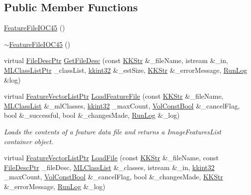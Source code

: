 \subsection*{Public Member Functions}
\begin{DoxyCompactItemize}
\item 
\hyperlink{class_k_k_m_l_l_1_1_feature_file_i_o_c45_ad1763dd3f92404588d80d21b8fff83c8}{Feature\+File\+I\+O\+C45} ()
\item 
\hyperlink{class_k_k_m_l_l_1_1_feature_file_i_o_c45_a890a0a2b3f62a0d0de6d4b85a2873f6f}{$\sim$\+Feature\+File\+I\+O\+C45} ()
\item 
virtual \hyperlink{namespace_k_k_m_l_l_aa0d0b6ab4ec18868a399b8455b05d914}{File\+Desc\+Ptr} \hyperlink{class_k_k_m_l_l_1_1_feature_file_i_o_c45_a17aa8ed6fcf2e293af5e018fc12a75d0}{Get\+File\+Desc} (const \hyperlink{class_k_k_b_1_1_k_k_str}{K\+K\+Str} \&\+\_\+file\+Name, istream \&\+\_\+in, \hyperlink{namespace_k_k_m_l_l_af091cde3f4a4315658b41a5e7583fc26}{M\+L\+Class\+List\+Ptr} \+\_\+class\+List, \hyperlink{namespace_k_k_b_a8fa4952cc84fda1de4bec1fbdd8d5b1b}{kkint32} \&\+\_\+est\+Size, \hyperlink{class_k_k_b_1_1_k_k_str}{K\+K\+Str} \&\+\_\+error\+Message, \hyperlink{class_k_k_b_1_1_run_log}{Run\+Log} \&log)
\item 
virtual \hyperlink{namespace_k_k_m_l_l_acf2ba92a3cf03e2b19674b24ff488ef6}{Feature\+Vector\+List\+Ptr} \hyperlink{class_k_k_m_l_l_1_1_feature_file_i_o_c45_a5223da28157b11024119c1edd93143c2}{Load\+Feature\+File} (const \hyperlink{class_k_k_b_1_1_k_k_str}{K\+K\+Str} \&\+\_\+file\+Name, \hyperlink{class_k_k_m_l_l_1_1_m_l_class_list}{M\+L\+Class\+List} \&\+\_\+ml\+Classes, \hyperlink{namespace_k_k_b_a8fa4952cc84fda1de4bec1fbdd8d5b1b}{kkint32} \+\_\+max\+Count, \hyperlink{namespace_k_k_b_a7d390f568e2831fb76b86b56c87bf92f}{Vol\+Const\+Bool} \&\+\_\+cancel\+Flag, bool \&\+\_\+successful, bool \&\+\_\+changes\+Made, \hyperlink{class_k_k_b_1_1_run_log}{Run\+Log} \&\+\_\+log)
\begin{DoxyCompactList}\small\item\em Loads the contents of a feature data file and returns a Image\+Features\+List container object. \end{DoxyCompactList}\item 
virtual \hyperlink{namespace_k_k_m_l_l_acf2ba92a3cf03e2b19674b24ff488ef6}{Feature\+Vector\+List\+Ptr} \hyperlink{class_k_k_m_l_l_1_1_feature_file_i_o_c45_a50c64295fe00ad20996b39665e5f1305}{Load\+File} (const \hyperlink{class_k_k_b_1_1_k_k_str}{K\+K\+Str} \&\+\_\+file\+Name, const \hyperlink{namespace_k_k_m_l_l_aa0d0b6ab4ec18868a399b8455b05d914}{File\+Desc\+Ptr} \+\_\+file\+Desc, \hyperlink{class_k_k_m_l_l_1_1_m_l_class_list}{M\+L\+Class\+List} \&\+\_\+classes, istream \&\+\_\+in, \hyperlink{namespace_k_k_b_a8fa4952cc84fda1de4bec1fbdd8d5b1b}{kkint32} \+\_\+max\+Count, \hyperlink{namespace_k_k_b_a7d390f568e2831fb76b86b56c87bf92f}{Vol\+Const\+Bool} \&\+\_\+cancel\+Flag, bool \&\+\_\+changes\+Made, \hyperlink{class_k_k_b_1_1_k_k_str}{K\+K\+Str} \&\+\_\+error\+Message, \hyperlink{class_k_k_b_1_1_run_log}{Run\+Log} \&\+\_\+log)

\end{DoxyCompactItemize}
